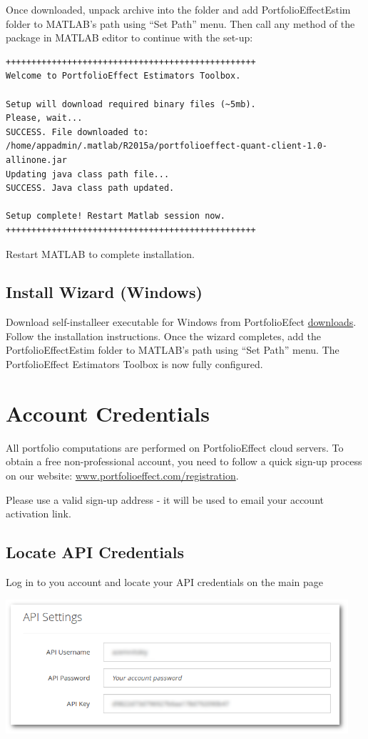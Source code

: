 \documentclass[letterpaper]{report}
\begin{document}
Once downloaded, unpack archive into the folder and add
PortfolioEffectEstim folder to MATLAB's path using ``Set Path'' menu. Then call
any method of the package in MATLAB editor to continue with the set-up:
\begin{lstlisting}
+++++++++++++++++++++++++++++++++++++++++++++++++
Welcome to PortfolioEffect Estimators Toolbox.

Setup will download required binary files (~5mb).
Please, wait...
SUCCESS. File downloaded to: 
/home/appadmin/.matlab/R2015a/portfolioeffect-quant-client-1.0-allinone.jar
Updating java class path file...
SUCCESS. Java class path updated.

Setup complete! Restart Matlab session now.
+++++++++++++++++++++++++++++++++++++++++++++++++
\end{lstlisting}

Restart MATLAB to complete installation.

\section{Install Wizard (Windows)}
Download self-installeer executable for Windows from PortfolioEfect
\href{https://www.portfolioeffect.com/docs/platform/quant/downloads}{downloads}.
Follow the installation instructions. Once the wizard completes, add the
PortfolioEffectEstim folder to MATLAB's path using ``Set Path'' menu. 
The PortfolioEffect Estimators Toolbox is now fully configured.

\chapter{Account Credentials}
All portfolio computations are performed on PortfolioEffect cloud servers.
To obtain a free non-professional account, you need to follow a quick sign-up
process on our website:
\href{https://www.portfolioeffect.com/registration}{www.portfolioeffect.com/registration}.\par
Please use a valid sign-up address - it will be used to email your
account activation link.

\section{Locate API Credentials} 
Log in to you account and locate your API credentials on the main page

\includegraphics[width=5in,natwidth=768,natheight=300]{img/api-settings.png}
 
\end{document}
